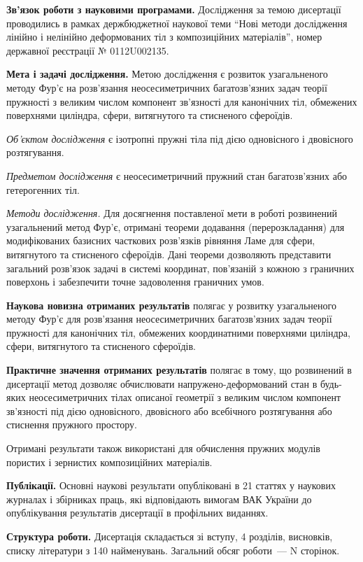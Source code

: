 \documentclass[book,14pt,small,oneside]{ncc}
\begin{document}
{\bf Зв'язок роботи з науковими програмами.} Дослідження за темою дисертації проводились в рамках держбюджетної наукової теми ``Нові методи дослідження лінійно і нелінійно деформованих тіл з композиційних матеріалів'', номер державної реєстрації № 0112U002135.

{\bf Мета і задачі дослідження.} Метою дослідження є розвиток узагальненого методу Фур'є на розв'язання неосесиметричних багатозв'язних задач теорії пружності з великим числом компонент зв'язності для канонічних тіл, обмежених поверхнями циліндра, сфери, витягнутого та стисненого сфероїдів.

{\it Об'єктом дослідження} є ізотропні пружні тіла під дією одновісного і двовісного розтягування.

{\it Предметом дослідження} є неосесиметричний пружний стан багатозв'язних або гетерогенних тіл.

{\it Методи дослідження.} Для досягнення поставленої мети в роботі розвинений узагальнений метод Фур'є, отримані теореми додавання (перерозкладання) для модифікованих базисних часткових розв'язків рівняння Ламе для сфери, витягнутого та стисненого сфероїдів. Дані теореми дозволяють представити загальний розв'язок задачі в системі координат, пов'язаній з кожною з граничних поверхонь і забезпечити точне задоволення граничних умов.

{\bf Наукова новизна отриманих результатів} полягає у розвитку узагальненого методу Фур'є для розв'язання неосесиметричних багатозв'язних задач теорії пружності для канонічних тіл, обмежених координатними поверхнями циліндра, сфери, витягнутого та стисненого сфероїдів.

{\bf Практичне значення отриманих результатів} полягає в тому, що розвинений в дисертації метод дозволяє обчислювати напружено-деформований стан в будь-яких неосесиметричних тілах описаної геометрії з великим числом компонент зв'язності під дією одновісного, двовісного або всебічного розтягування або стиснення пружного простору.

Отримані результати також використані для обчислення пружних модулів пористих і зернистих композиційних матеріалів.

{\bf Публікації.} Основні наукові результати опубліковані в 21 статтях у наукових журналах і збірниках праць, які відповідають вимогам ВАК України до опублікування результатів дисертації в профільних виданнях.

{\bf Структура роботи.} Дисертація складається зі вступу, 4 розділів, висновків, списку літератури з 140 найменувань. Загальний обсяг роботи~--- N сторінок.
\end{document}

